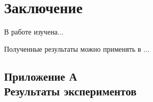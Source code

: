 \documentclass[a4paper,14pt]{article}
\begin{document}
    \newpage


    \section{Заключение}

    В работе изучена...

    Полученные результаты можно применять в ...

    \newpage
    \renewcommand{\refname}{{\normalsize \hfill Список использованных источников \hfill}}
%    
    
    
    \newpage

    \begin{landscape}

        \begin{flushright}
            \section*{\normalsize \hfill Приложение А \\ \hfill Результаты экспериментов}
        \end{flushright}


\end{landscape}
\end{document}
